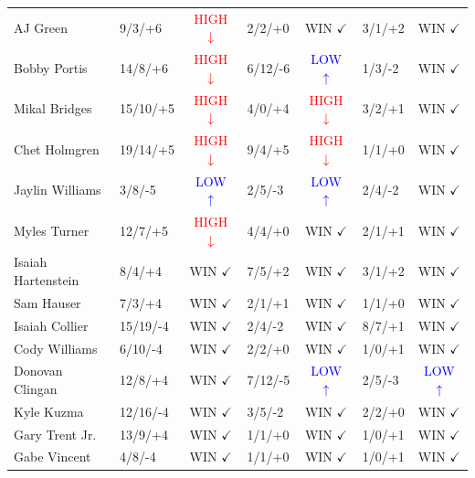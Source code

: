 \documentclass{article}
\begin{document}
\begin{table}[h]
\begin{tabular}{llclclc}
AJ Green & 9/3/+6 & \textcolor{red}{HIGH $\downarrow$} & 2/2/+0 & \textcolor{green!70!black}{WIN $\checkmark$} & 3/1/+2 & \textcolor{green!70!black}{WIN $\checkmark$} \\
Bobby Portis & 14/8/+6 & \textcolor{red}{HIGH $\downarrow$} & 6/12/-6 & \textcolor{blue}{LOW $\uparrow$} & 1/3/-2 & \textcolor{green!70!black}{WIN $\checkmark$} \\
Mikal Bridges & 15/10/+5 & \textcolor{red}{HIGH $\downarrow$} & 4/0/+4 & \textcolor{red}{HIGH $\downarrow$} & 3/2/+1 & \textcolor{green!70!black}{WIN $\checkmark$} \\
Chet Holmgren & 19/14/+5 & \textcolor{red}{HIGH $\downarrow$} & 9/4/+5 & \textcolor{red}{HIGH $\downarrow$} & 1/1/+0 & \textcolor{green!70!black}{WIN $\checkmark$} \\
Jaylin Williams & 3/8/-5 & \textcolor{blue}{LOW $\uparrow$} & 2/5/-3 & \textcolor{blue}{LOW $\uparrow$} & 2/4/-2 & \textcolor{green!70!black}{WIN $\checkmark$} \\
Myles Turner & 12/7/+5 & \textcolor{red}{HIGH $\downarrow$} & 4/4/+0 & \textcolor{green!70!black}{WIN $\checkmark$} & 2/1/+1 & \textcolor{green!70!black}{WIN $\checkmark$} \\
Isaiah Hartenstein & 8/4/+4 & \textcolor{green!70!black}{WIN $\checkmark$} & 7/5/+2 & \textcolor{green!70!black}{WIN $\checkmark$} & 3/1/+2 & \textcolor{green!70!black}{WIN $\checkmark$} \\
Sam Hauser & 7/3/+4 & \textcolor{green!70!black}{WIN $\checkmark$} & 2/1/+1 & \textcolor{green!70!black}{WIN $\checkmark$} & 1/1/+0 & \textcolor{green!70!black}{WIN $\checkmark$} \\
Isaiah Collier & 15/19/-4 & \textcolor{green!70!black}{WIN $\checkmark$} & 2/4/-2 & \textcolor{green!70!black}{WIN $\checkmark$} & 8/7/+1 & \textcolor{green!70!black}{WIN $\checkmark$} \\
Cody Williams & 6/10/-4 & \textcolor{green!70!black}{WIN $\checkmark$} & 2/2/+0 & \textcolor{green!70!black}{WIN $\checkmark$} & 1/0/+1 & \textcolor{green!70!black}{WIN $\checkmark$} \\
Donovan Clingan & 12/8/+4 & \textcolor{green!70!black}{WIN $\checkmark$} & 7/12/-5 & \textcolor{blue}{LOW $\uparrow$} & 2/5/-3 & \textcolor{blue}{LOW $\uparrow$} \\
Kyle Kuzma & 12/16/-4 & \textcolor{green!70!black}{WIN $\checkmark$} & 3/5/-2 & \textcolor{green!70!black}{WIN $\checkmark$} & 2/2/+0 & \textcolor{green!70!black}{WIN $\checkmark$} \\
Gary Trent Jr. & 13/9/+4 & \textcolor{green!70!black}{WIN $\checkmark$} & 1/1/+0 & \textcolor{green!70!black}{WIN $\checkmark$} & 1/0/+1 & \textcolor{green!70!black}{WIN $\checkmark$} \\
Gabe Vincent & 4/8/-4 & \textcolor{green!70!black}{WIN $\checkmark$} & 1/1/+0 & \textcolor{green!70!black}{WIN $\checkmark$} & 1/0/+1 & \textcolor{green!70!black}{WIN $\checkmark$} \\
\bottomrule
\end{tabular}
\end{table}
\end{document}
